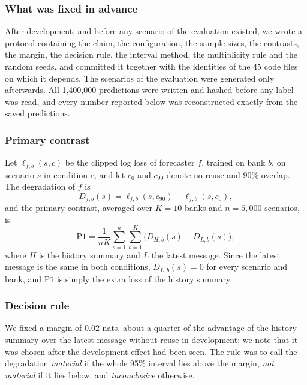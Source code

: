 \documentclass[conference]{IEEEtran}
\newcommand{\Pone}{\mathrm{P1}}
\begin{document}
\subsubsection*{What was fixed in advance}
After development, and before any scenario of the evaluation existed, we wrote a protocol containing the claim, the configuration, the sample sizes, the contrasts, the margin, the decision rule, the interval method, the multiplicity rule and the random seeds, and committed it together with the identities of the 45 code files on which it depends. The scenarios of the evaluation were generated only afterwards. All 1,400,000 predictions were written and hashed before any label was read, and every number reported below was reconstructed exactly from the saved predictions.

\subsubsection*{Primary contrast}
Let $\ell_{f,b}(s,c)$ be the clipped log loss of forecaster $f$, trained on bank $b$, on scenario $s$ in condition $c$, and let $c_0$ and $c_{90}$ denote no reuse and 90\% overlap. The degradation of $f$ is
\[
  D_{f,b}(s)=\ell_{f,b}(s,c_{90})-\ell_{f,b}(s,c_{0}),
\]
and the primary contrast, averaged over $K=10$ banks and $n=5{,}000$ scenarios, is
\begin{equation}\label{eq:p1}
  \Pone=\frac{1}{nK}\sum_{s=1}^{n}\sum_{b=1}^{K}\bigl(D_{H,b}(s)-D_{L,b}(s)\bigr),
\end{equation}
where $H$ is the history summary and $L$ the latest message. Since the latest message is the same in both conditions, $D_{L,b}(s)=0$ for every scenario and bank, and $\Pone$ is simply the extra loss of the history summary.

\subsubsection*{Decision rule}
We fixed a margin of 0.02 nats, about a quarter of the advantage of the history summary over the latest message without reuse in development; we note that it was chosen after the development effect had been seen. The rule was to call the degradation \emph{material} if the whole 95\% interval lies above the margin, \emph{not material} if it lies below, and \emph{inconclusive} otherwise.
\end{document}
